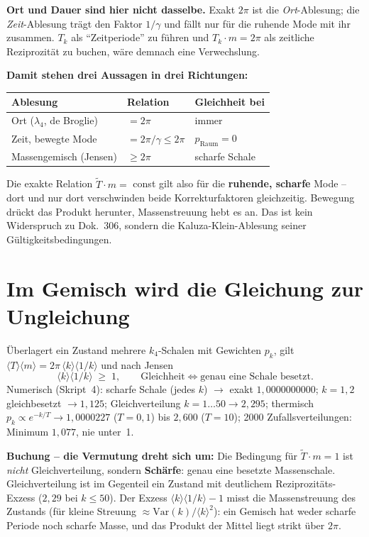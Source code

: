 \textbf{Ort und Dauer sind hier nicht dasselbe.} Exakt $2\pi$ ist
die \emph{Ort}-Ablesung; die \emph{Zeit}-Ablesung trägt den Faktor
$1/\gamma$ und fällt nur für die ruhende Mode mit ihr zusammen.
$T_k$ als \enquote{Zeitperiode} zu führen und
$T_k\cdot m = 2\pi$ als zeitliche Reziprozität zu buchen, wäre
demnach eine Verwechslung.

\textbf{Damit stehen drei Aussagen in drei Richtungen:}
\begin{center}
\begin{tabular}{lll}
\toprule
Ablesung & Relation & Gleichheit bei \\
\midrule
Ort ($\lambda_4$, de Broglie) & $=2\pi$ & immer \\
Zeit, bewegte Mode & $=2\pi/\gamma \le 2\pi$ &
  $p_\text{Raum} = 0$ \\
Massengemisch (Jensen) & $\ge 2\pi$ & scharfe Schale \\
\bottomrule
\end{tabular}
\end{center}

\noindent Die exakte Relation $\tilde T\cdot m = $ const gilt also
für die \textbf{ruhende, scharfe} Mode -- dort und nur dort
verschwinden beide Korrekturfaktoren gleichzeitig. Bewegung
drückt das Produkt herunter, Massenstreuung hebt es an. Das ist
kein Widerspruch zu Dok.~306, sondern die Kaluza-Klein-Ablesung
seiner Gültigkeitsbedingungen.

\section{Im Gemisch wird die Gleichung zur Ungleichung}

Überlagert ein Zustand mehrere $k_4$-Schalen mit Gewichten $p_k$,
gilt $\langle T\rangle\langle m\rangle =
2\pi\,\langle k\rangle\langle 1/k\rangle$ und nach Jensen
\begin{equation}
  \langle k\rangle\langle 1/k\rangle \;\ge\; 1,
  \qquad\text{Gleichheit} \iff \text{genau eine Schale besetzt.}
\end{equation}
Numerisch (Skript~4): scharfe Schale (jedes $k$) $\to$ exakt
$1{,}0000000000$; $k = 1,2$ gleichbesetzt $\to 1{,}125$;
Gleichverteilung $k = 1\ldots50 \to 2{,}295$; thermisch
$p_k \propto e^{-k/T} \to 1{,}0000227$ ($T = 0{,}1$) bis
$2{,}600$ ($T = 10$); 2000 Zufallsverteilungen: Minimum
$1{,}077$, nie unter~1.

\textbf{Buchung -- die Vermutung dreht sich um:} Die Bedingung
für $\tilde T\cdot m = 1$ ist \emph{nicht} Gleichverteilung,
sondern \textbf{Schärfe}: genau eine besetzte Massenschale.
Gleichverteilung ist im Gegenteil ein Zustand mit deutlichem
Reziprozitäts-Exzess ($2{,}29$ bei $k \le 50$). Der Exzess
$\langle k\rangle\langle 1/k\rangle - 1$ misst die Massenstreuung
des Zustands (für kleine Streuung
$\approx \mathrm{Var}(k)/\langle k\rangle^2$): ein Gemisch hat
weder scharfe Periode noch scharfe Masse, und das Produkt der
Mittel liegt strikt über $2\pi$.

